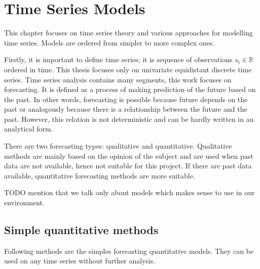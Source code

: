\chapter{Time Series Models} \label{models}
This chapter focuses on time series theory and various approaches for modelling time series.
Models are ordered from simpler to more complex ones. 

Firstly, it is important to define time series; it is sequence of observations
$s_t \in \mathbb{R}$ ordered in time. This thesis focuses only on univariate equidistant 
discrete time series. Time series analysis contains many segments, this work focuses on 
forecasting. It is defined as a process of making prediction of the future based 
on the past. In other words, forecasting is possible because  
future depends on the past or analogously because there is a relationship
between the future and the past. However, this relation is not deterministic and 
can be hardly written in an analytical form.

There are two forecasting types: qualitative and quantitative.
Qualitative methods are mainly based on the opinion of the subject and are used 
when past data are not available, hence not suitable for this project. 
If there are past data available, quantitative forecasting methods are more suitable. 

TODO mention that we talk only about models which makes sense to use in our environment.

    \section{Simple quantitative methods}
    Following methods are the simples forecasting quantitative models. They can be used on
    any time series without further analysis. 

